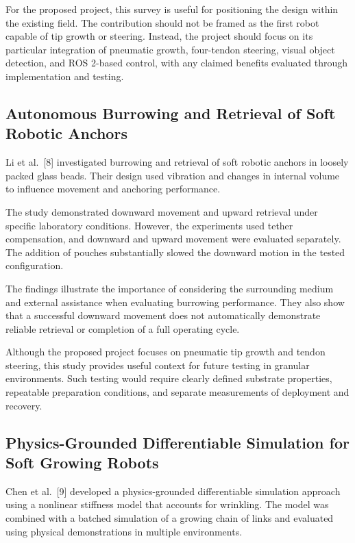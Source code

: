 For the proposed project, this survey is useful for positioning the design within the existing field. The contribution should not be framed as the first robot capable of tip growth or steering. Instead, the project should focus on its particular integration of pneumatic growth, four-tendon steering, visual object detection, and ROS 2-based control, with any claimed benefits evaluated through implementation and testing.

\subsection{Autonomous Burrowing and Retrieval of Soft Robotic Anchors}

Li et al.~[8] investigated burrowing and retrieval of soft robotic anchors in loosely packed glass beads. Their design used vibration and changes in internal volume to influence movement and anchoring performance.

The study demonstrated downward movement and upward retrieval under specific laboratory conditions. However, the experiments used tether compensation, and downward and upward movement were evaluated separately. The addition of pouches substantially slowed the downward motion in the tested configuration.

The findings illustrate the importance of considering the surrounding medium and external assistance when evaluating burrowing performance. They also show that a successful downward movement does not automatically demonstrate reliable retrieval or completion of a full operating cycle.

Although the proposed project focuses on pneumatic tip growth and tendon steering, this study provides useful context for future testing in granular environments. Such testing would require clearly defined substrate properties, repeatable preparation conditions, and separate measurements of deployment and recovery.

\subsection{Physics-Grounded Differentiable Simulation for Soft Growing Robots}

Chen et al.~[9] developed a physics-grounded differentiable simulation approach using a nonlinear stiffness model that accounts for wrinkling. The model was combined with a batched simulation of a growing chain of links and evaluated using physical demonstrations in multiple environments.

